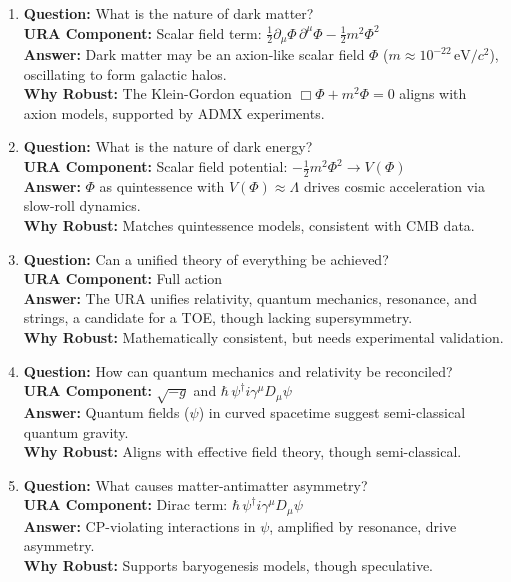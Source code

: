 \documentclass[12pt]{article}
\begin{document}
\begin{enumerate}
    \item \textbf{Question:} What is the nature of dark matter? \\
    \textbf{URA Component:} Scalar field term: \(\frac{1}{2} \partial_\mu \Phi \, \partial^\mu \Phi - \frac{1}{2} m^2 \Phi^2\) \\
    \textbf{Answer:} Dark matter may be an axion-like scalar field \(\Phi\) (\(m \approx 10^{-22} \, \text{eV}/c^2\)), oscillating to form galactic halos. \\
    \textbf{Why Robust:} The Klein-Gordon equation \(\Box \Phi + m^2 \Phi = 0\) aligns with axion models, supported by ADMX experiments.

    \item \textbf{Question:} What is the nature of dark energy? \\
    \textbf{URA Component:} Scalar field potential: \(-\frac{1}{2} m^2 \Phi^2 \to V(\Phi)\) \\
    \textbf{Answer:} \(\Phi\) as quintessence with \(V(\Phi) \approx \Lambda\) drives cosmic acceleration via slow-roll dynamics. \\
    \textbf{Why Robust:} Matches quintessence models, consistent with CMB data.

    \item \textbf{Question:} Can a unified theory of everything be achieved? \\
    \textbf{URA Component:} Full action \\
    \textbf{Answer:} The URA unifies relativity, quantum mechanics, resonance, and strings, a candidate for a TOE, though lacking supersymmetry. \\
    \textbf{Why Robust:} Mathematically consistent, but needs experimental validation.

    \item \textbf{Question:} How can quantum mechanics and relativity be reconciled? \\
    \textbf{URA Component:} \(\sqrt{-g}\) and \(\hbar \, \psi^\dagger i\gamma^\mu D_\mu \psi\) \\
    \textbf{Answer:} Quantum fields (\(\psi\)) in curved spacetime suggest semi-classical quantum gravity. \\
    \textbf{Why Robust:} Aligns with effective field theory, though semi-classical.

    \item \textbf{Question:} What causes matter-antimatter asymmetry? \\
    \textbf{URA Component:} Dirac term: \(\hbar \, \psi^\dagger i\gamma^\mu D_\mu \psi\) \\
    \textbf{Answer:} CP-violating interactions in \(\psi\), amplified by resonance, drive asymmetry. \\
    \textbf{Why Robust:} Supports baryogenesis models, though speculative.


\end{enumerate}
\end{document}
